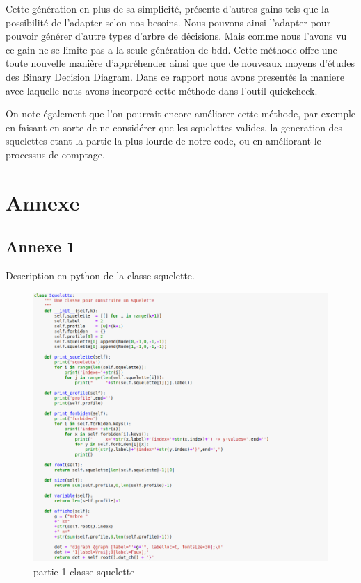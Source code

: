 \documentclass[french]{article}
\begin{document}
Cette génération en plus de sa simplicité, présente d'autres gains tels que la possibilité de l'adapter selon nos besoins. Nous pouvons ainsi l'adapter pour pouvoir générer d'autre types d'arbre de décisions.
Mais comme nous l'avons vu ce gain ne se limite pas a la seule génération de bdd. Cette méthode offre une toute nouvelle manière d'appréhender ainsi que que de nouveaux moyens d'études des Binary Decision Diagram. Dans ce rapport nous avons presentés la maniere avec laquelle nous avons incorporé cette méthode dans l'outil quickcheck.
\vspace{5mm} 

On note également que l'on pourrait encore améliorer cette méthode, par exemple en faisant en sorte de ne considérer que les squelettes valides, la generation des squelettes etant la partie la plus lourde de notre code, ou en améliorant le processus de comptage. 
\newpage
\section{Annexe}
\subsection{Annexe 1}
\label{Annexe_1}
Description en python de la classe squelette. 

\begin{figure}[H]
    \centering
    \includegraphics[scale=0.4]{part1_squelette.png}
    \caption{partie 1 classe squelette}
    \label{fig:squelette1}
\end{figure}
\end{document}
